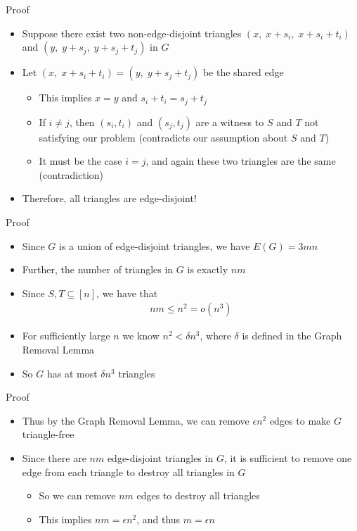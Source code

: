 \begin{frame}{Proof}
\begin{itemize}
	\item Suppose there exist two non-edge-disjoint triangles $(x,\; x+s_i,\; x+s_i+t_i)$ and $(y,\; y+s_j,\; y+s_j + t_j)$ in $G$
	\item<2-> Let $(x,\; x+s_i+t_i) = (y,\; y + s_j + t_j)$ be the shared edge
	\begin{itemize}
		\item<3-> This implies $x = y$ and $s_i + t_i = s_j + t_j$
		\item<4-> If $i \neq j$, then $(s_i, t_i)$ and $(s_j, t_j)$ are a witness to $S$ and $T$ not satisfying our problem (contradicts our assumption about $S$ and $T$)
		\item<5-> It must be the case $i = j$, and again these two triangles are the same (contradiction)
	\end{itemize}
	\item<6-> Therefore, all triangles are edge-disjoint!
\end{itemize}
\end{frame}

\begin{frame}{Proof}
\begin{itemize}
	\item<1-> Since $G$ is a union of edge-disjoint triangles, we have $E(G) = 3mn$
	\item<2-> Further, the number of triangles in $G$ is exactly $nm$
	\item<3-> Since $S, T \subseteq [n]$, we have that
	\begin{align*}
	nm \leq n^2 = o(n^3)
	\end{align*}
	\item<4-> For sufficiently large $n$ we know $n^2 < \delta n^3$, where $\delta$ is defined in the Graph Removal Lemma
	\item<5-> So $G$ has at most $\delta n^3$ triangles
\end{itemize}
\end{frame}

\begin{frame}{Proof}
\begin{itemize}
	\item Thus by the Graph Removal Lemma, we can remove $\epsilon n^2$ edges to make $G$ triangle-free
	\item<2-> Since there are $nm$ edge-disjoint triangles in $G$, it is sufficient to remove one edge from each triangle to destroy all triangles in $G$
	\begin{itemize}
		\item<3-> So we can remove $nm$ edges to destroy all triangles
		\item<4-> This implies $nm = \epsilon n^2$, and thus $m = \epsilon n$
	\end{itemize}
\end{itemize}
\end{frame}


